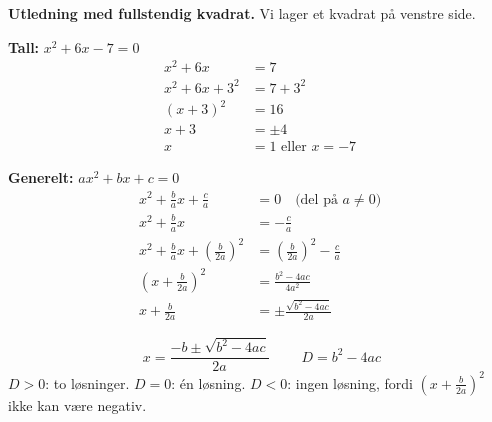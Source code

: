 \begin{mustkunne}
\textbf{Utledning med fullstendig kvadrat.} Vi lager et kvadrat på venstre side.

\smallskip
\begin{minipage}[t]{0.46\linewidth}
\textbf{Tall:} $x^2 + 6x - 7 = 0$
\begin{align*}
x^2 + 6x &= 7\\
x^2 + 6x + 3^2 &= 7 + 3^2\\
(x + 3)^2 &= 16\\
x + 3 &= \pm 4\\
x &= 1 \text{ eller } x = -7
\end{align*}
\end{minipage}\hfill
\begin{minipage}[t]{0.50\linewidth}
\textbf{Generelt:} $ax^2 + bx + c = 0$
\begin{align*}
x^2 + \frac{b}{a}x + \frac{c}{a} &= 0 \quad \text{(del på } a \neq 0)\\
x^2 + \frac{b}{a}x &= -\frac{c}{a}\\
x^2 + \frac{b}{a}x + \left(\frac{b}{2a}\right)^2 &= \left(\frac{b}{2a}\right)^2 - \frac{c}{a}\\
\left(x + \frac{b}{2a}\right)^2 &= \frac{b^2 - 4ac}{4a^2}\\
x + \frac{b}{2a} &= \pm \frac{\sqrt{b^2 - 4ac}}{2a}
\end{align*}
\end{minipage}

\medskip
\[ \boxed{\;x = \frac{-b \pm \sqrt{b^2 - 4ac}}{2a}\;} \qquad D = b^2 - 4ac \]
$D > 0$: to løsninger. $D = 0$: én løsning. $D < 0$: ingen løsning, fordi $\left(x + \frac{b}{2a}\right)^2$ ikke kan være negativ.


\end{mustkunne}
